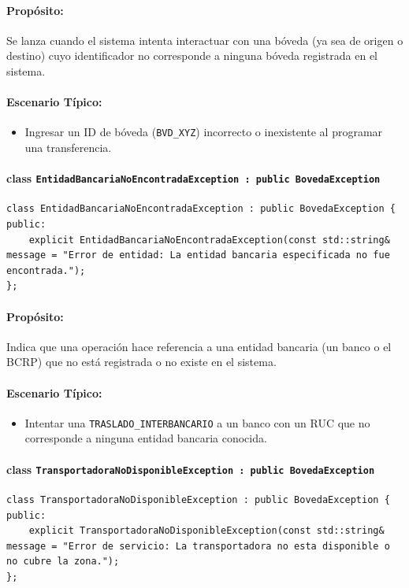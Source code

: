 \documentclass{article}
\newcommand{\inlinecode}[1]{\texttt{#1}}
\begin{document}
\paragraph*{Propósito:} Se lanza cuando el sistema intenta interactuar con una bóveda (ya sea de origen o destino) cuyo identificador no corresponde a ninguna bóveda registrada en el sistema.

\paragraph*{Escenario Típico:}
\begin{itemize}
    \item Ingresar un ID de bóveda (\inlinecode{BVD\_XYZ}) incorrecto o inexistente al programar una transferencia.
\end{itemize}

\paragraph*{\textbf{class \inlinecode{EntidadBancariaNoEncontradaException : public BovedaException}}}
\begin{lstlisting}
class EntidadBancariaNoEncontradaException : public BovedaException {
public:
    explicit EntidadBancariaNoEncontradaException(const std::string& message = "Error de entidad: La entidad bancaria especificada no fue encontrada.");
};
\end{lstlisting}
\paragraph*{Propósito:} Indica que una operación hace referencia a una entidad bancaria (un banco o el BCRP) que no está registrada o no existe en el sistema.

\paragraph*{Escenario Típico:}
\begin{itemize}
    \item Intentar una \inlinecode{TRASLADO\_INTERBANCARIO} a un banco con un RUC que no corresponde a ninguna entidad bancaria conocida.
\end{itemize}

\paragraph*{\textbf{class \inlinecode{TransportadoraNoDisponibleException : public BovedaException}}}
\begin{lstlisting}
class TransportadoraNoDisponibleException : public BovedaException {
public:
    explicit TransportadoraNoDisponibleException(const std::string& message = "Error de servicio: La transportadora no esta disponible o no cubre la zona.");
};
\end{lstlisting}
\end{document}
